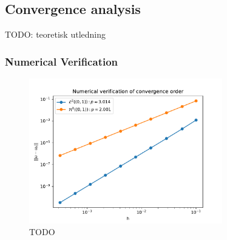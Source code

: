 \subsection{Convergence analysis}


TODO: teoretisk utledning


\subsubsection{Numerical Verification}


\begin{figure}[!h]
  \centering
  \includegraphics[width=0.75\textwidth]{Images/plots/task1_conv_plot.pdf}
  \caption{TODO}
  \label{fig:conv_plot}
\end{figure}

